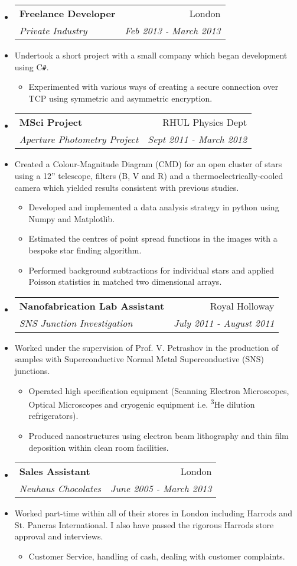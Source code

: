 \documentclass[letterpaper,11pt]{article}
\makeatletter
\newcommand{\resitem}[1]{\item #1 \vspace{-2pt}}
\newcommand{\ressubheading}[4]{
                \begin{tabular*}{180mm}{l@{\extracolsep{\fill}}r}
                \textbf{#1} & #2 \\
                \textit{#3} & \textit{#4} \\
                \end{tabular*}\vspace{-6pt}
}
\newcommand{\resdescription}[1]{#1 \vspace{-0mm}}
\makeatother
\begin{document}
\begin{itemize}
  \item[]
  \ressubheading{Freelance Developer}{London}{Private Industry}{Feb 2013 - March 2013}
  \item[]
    \resdescription{Undertook a short project with a small company which began development using C\texttt{\#}.}
    \begin{itemize}
      \resitem{Experimented with various ways of creating a secure connection over TCP using symmetric and asymmetric encryption.}
    \end{itemize}

  \item[]
  \ressubheading{MSci Project}{RHUL Physics Dept}{Aperture Photometry Project}{Sept 2011 - March 2012}
  \item[]
    \resdescription{Created a Colour-Magnitude Diagram (CMD) for an open cluster of stars using a 12'' telescope, filters (B, V and R) and a thermoelectrically-cooled camera which yielded results consistent with previous studies.}
    \begin{itemize}
      \resitem{Developed and implemented a data analysis strategy in python using Numpy and Matplotlib.}
      \resitem{Estimated the centres of point spread functions in the images with a bespoke star finding algorithm.}
      \resitem{Performed background subtractions for individual stars and applied Poisson statistics in matched two dimensional arrays.}
    \end{itemize}

  \item[]
  \ressubheading{Nanofabrication Lab Assistant}{Royal Holloway}{SNS Junction Investigation}{July 2011 - August 2011}
  \item[]
     \resdescription{Worked under the supervision of Prof. V. Petrashov in the production of samples with Superconductive Normal Metal Superconductive (SNS) junctions.}
     \begin{itemize}
       \resitem{Operated high specification equipment (Scanning Electron Microscopes, Optical Microscopes and cryogenic equipment i.e. \textsuperscript{3}He dilution refrigerators).}
       \resitem{Produced nanostructures using electron beam lithography and thin film deposition within clean room facilities.}
     \end{itemize}

  \item[]
  \ressubheading{Sales Assistant}{London}{Neuhaus Chocolates}{June 2005 - March 2013}
  \item[]
    \resdescription{Worked part-time within all of their stores in London including Harrods and St. Pancras International. I also have passed the rigorous Harrods store approval and interviews.}
    \begin{itemize}
      \resitem{Customer Service, handling of cash, dealing with customer complaints.}
    \end{itemize}

\end{itemize}
\end{document}
